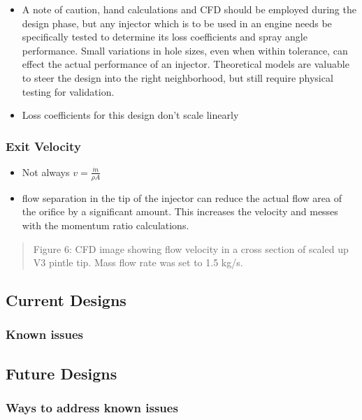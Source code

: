 \documentclass[11pt]{article}
\providecommand{\tightlist}{%
      \setlength{\itemsep}{0pt}\setlength{\parskip}{0pt}}
\begin{document}
\begin{itemize}
\item
  A note of caution, hand calculations and CFD should be employed during
  the design phase, but any injector which is to be used in an engine
  needs be specifically tested to determine its loss coefficients and
  spray angle performance. Small variations in hole sizes, even when
  within tolerance, can effect the actual performance of an injector.
  Theoretical models are valuable to steer the design into the right
  neighborhood, but still require physical testing for validation.
\item
  Loss coefficients for this design don't scale linearly
\end{itemize}

\subsubsection{Exit Velocity}\label{exit-velocity}

\begin{itemize}
\tightlist
\item
  Not always \(v = \frac{\dot{m}}{\rho A}\)
\item
  flow separation in the tip of the injector can reduce the actual flow
  area of the orifice by a significant amount. This increases the
  velocity and messes with the momentum ratio calculations.
\end{itemize}

\begin{quote}
Figure 6: CFD image showing flow velocity in a cross section of scaled
up V3 pintle tip. Mass flow rate was set to 1.5 kg/s.
\end{quote}

\subsection{Current Designs}\label{current-designs}

\subsubsection{Known issues}\label{known-issues}

\subsection{Future Designs}\label{future-designs}

\subsubsection{Ways to address known
issues}\label{ways-to-address-known-issues}
\end{document}
